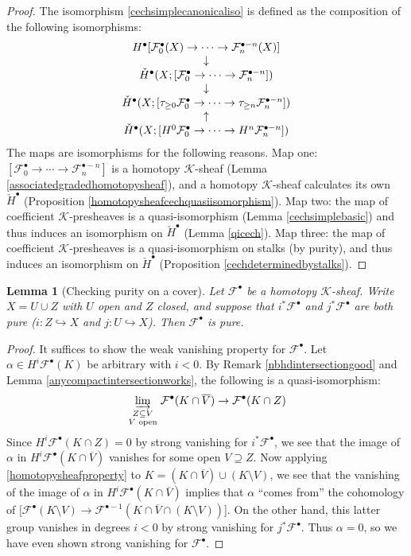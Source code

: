 \documentclass[12pt]{article}
\newtheorem{lemma}[theorem]{Lemma}
\theoremstyle{definition}
\theoremstyle{remark}
\numberwithin{equation}{subsection}
\newcommand{\F}{\mathcal F}
\newcommand{\K}{\mathcal K}
\newcommand{\cH}{\check H}
\begin{document}
\begin{proof}
The isomorphism \eqref{cechsimplecanonicaliso} is defined as the composition of the following isomorphisms:
\begin{equation}\label{isosforpurehtpysheafcech}
\begin{matrix}
H^\bullet[\F^\bullet_0(X)\to\cdots\to\F^{\bullet-n}_n(X)]\cr
\downarrow\cr
\cH^\bullet(X;[\F^\bullet_0\to\cdots\to\F^{\bullet-n}_n])\cr
\downarrow\cr
\cH^\bullet(X;[\tau_{\geq 0}\F^\bullet_0\to\cdots\to\tau_{\geq n}\F^{\bullet-n}_n])\cr
\uparrow\cr
\cH^\bullet(X;[H^0\F^\bullet_0\to\cdots\to H^n\F^{\bullet-n}_n])
\end{matrix}
\end{equation}
The maps are isomorphisms for the following reasons.  Map one: $[\F^\bullet_0\to\cdots\to\F^{\bullet-n}_n]$ is a homotopy $\K$-sheaf (Lemma \ref{associatedgradedhomotopysheaf}), and a homotopy $\K$-sheaf calculates its own $\cH^\bullet$ (Proposition \ref{homotopysheafcechquasiisomorphism}).  Map two: the map of coefficient $\K$-presheaves is a quasi-isomorphism (Lemma \ref{cechsimplebasic}) and thus induces an isomorphism on $\cH^\bullet$ (Lemma \ref{qicech}).  Map three: the map of coefficient $\K$-presheaves is a quasi-isomorphism on stalks (by purity), and thus induces an isomorphism on $\cH^\bullet$ (Proposition \ref{cechdeterminedbystalks}).
\end{proof}

\begin{lemma}[Checking purity on a cover]\label{openclosedpurity}
Let $\F^\bullet$ be a homotopy $\K$-sheaf.  Write $X=U\cup Z$ with $U$ open and $Z$ closed, and suppose that $i^\ast\F^\bullet$ and $j^\ast\F^\bullet$ are both pure ($i:Z\hookrightarrow X$ and $j:U\hookrightarrow X$).  Then $\F^\bullet$ is pure.
\end{lemma}

\begin{proof}
It suffices to show the weak vanishing property for $\F^\bullet$.  Let $\alpha\in H^i\F^\bullet(K)$ be arbitrary with $i<0$.  By Remark \ref{nbhdintersectiongood} and Lemma \ref{anycompactintersectionworks}, the following is a quasi-isomorphism:
\begin{equation}
\varinjlim_{\begin{smallmatrix}Z\subseteq V\cr V\textrm{ open}\end{smallmatrix}}\F^\bullet(K\cap\overline V)\to\F^\bullet(K\cap Z)
\end{equation}
Since $H^i\F^\bullet(K\cap Z)=0$ by strong vanishing for $i^\ast\F^\bullet$, we see that the image of $\alpha$ in $H^i\F^\bullet(K\cap\overline V)$ vanishes for some open $V\supseteq Z$.  Now applying \eqref{homotopysheafproperty} to $K=(K\cap\overline V)\cup(K\setminus V)$, we see that the vanishing of the image of $\alpha$ in $H^i\F^\bullet(K\cap\overline V)$ implies that $\alpha$ ``comes from'' the cohomology of $[\F^\bullet(K\setminus V)\to\F^{\bullet-1}(K\cap\overline V\cap(K\setminus V))$].  On the other hand, this latter group vanishes in degrees $i<0$ by strong vanishing for $j^\ast\F^\bullet$.  Thus $\alpha=0$, so we have even shown strong vanishing for $\F^\bullet$.
\end{proof}
\end{document}
